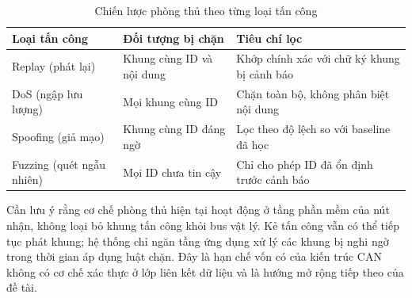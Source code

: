 \begin{table}[H]
	\centering
	\begin{tabular}{|>{\raggedright\arraybackslash}p{3.2cm}|>{\raggedright\arraybackslash}p{4.0cm}|>{\raggedright\arraybackslash}p{6.2cm}|}
		\hline
		\rowcolor{red!20}
		\textbf{Loại tấn công} &
		\textbf{Đối tượng bị chặn} &
		\textbf{Tiêu chí lọc} \\
		\hline
		
		Replay (phát lại) &
		Khung cùng ID và nội dung &
		Khớp chính xác với chữ ký khung bị cảnh báo \\
		\hline
		
		DoS (ngập lưu lượng) &
		Mọi khung cùng ID &
		Chặn toàn bộ, không phân biệt nội dung \\
		\hline
		
		Spoofing (giả mạo) &
		Khung cùng ID đáng ngờ &
		Lọc theo độ lệch so với baseline đã học \\
		\hline
		
		Fuzzing (quét ngẫu nhiên) &
		Mọi ID chưa tin cậy &
		Chỉ cho phép ID đã ổn định trước cảnh báo \\
		\hline
		
	\end{tabular}
	\caption{Chiến lược phòng thủ theo từng loại tấn công}
\end{table}
Cần lưu ý rằng cơ chế phòng thủ hiện tại hoạt động ở tầng phần mềm của nút nhận,
không loại bỏ khung tấn công khỏi bus vật lý. Kẻ tấn công vẫn có thể tiếp tục phát
khung; hệ thống chỉ ngăn tầng ứng dụng xử lý các khung bị nghi ngờ trong thời gian
áp dụng luật chặn. Đây là hạn chế vốn có của kiến trúc CAN không có cơ chế xác thực ở lớp
liên kết dữ liệu và là hướng mở rộng tiếp theo của đề tài.
